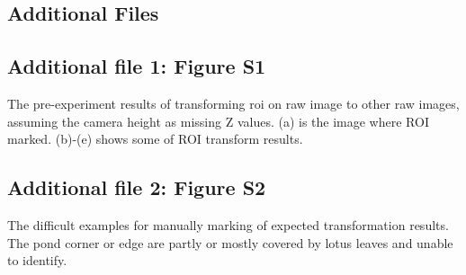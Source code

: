 \documentclass{configs/bmcart}
\begin{document}
\begin{backmatter}





\section*{Additional Files}
\subsection*{Additional file 1: Figure S1}
The pre-experiment results of transforming \acrfull*{roi} on raw image to other raw images, assuming the camera height as missing Z values. (a) is the image where ROI marked. (b)-(e) shows some of ROI transform results. 

\subsection*{Additional file 2: Figure S2}
The difficult examples for manually marking of expected transformation results. The pond corner or edge are partly or mostly covered by lotus leaves and unable to identify.


\end{backmatter}
\end{document}
